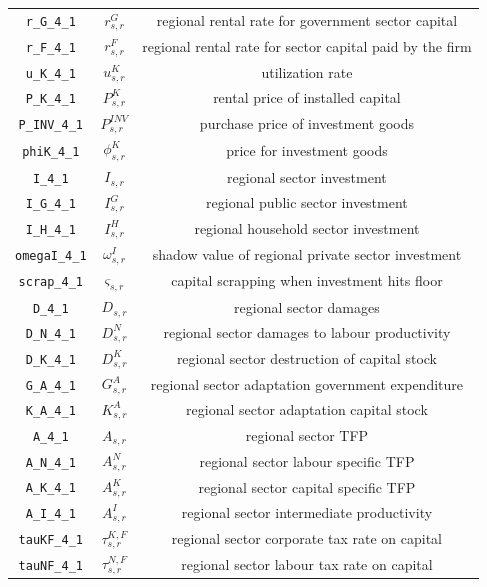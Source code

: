 \begin{center}
\begin{longtable}{ccc}
\texttt{r\_G\_4\_1} & ${r^G_{s,r}}$ & regional rental rate for government sector capital\\
\texttt{r\_F\_4\_1} & ${r^F_{s,r}}$ & regional rental rate for sector capital paid by the firm\\
\texttt{u\_K\_4\_1} & ${u^K_{s,r}}$ & utilization rate\\
\texttt{P\_K\_4\_1} & ${P^K_{s,r}}$ & rental price of installed capital\\
\texttt{P\_INV\_4\_1} & ${P^{INV}_{s,r}}$ & purchase price of investment goods\\
\texttt{phiK\_4\_1} & ${\phi^K_{s,r}}$ & price for investment goods\\
\texttt{I\_4\_1} & ${I_{s,r}}$ & regional sector investment\\
\texttt{I\_G\_4\_1} & ${I^G_{s,r}}$ & regional public sector investment\\
\texttt{I\_H\_4\_1} & ${I^H_{s,r}}$ & regional household sector investment\\
\texttt{omegaI\_4\_1} & ${\omega^I_{s,r}}$ & shadow value of regional private sector investment\\
\texttt{scrap\_4\_1} & ${\varsigma_{s,r}}$ & capital scrapping when investment hits floor\\
\texttt{D\_4\_1} & ${D_{s,r}}$ & regional sector damages\\
\texttt{D\_N\_4\_1} & ${D^N_{s,r}}$ & regional sector damages to labour productivity\\
\texttt{D\_K\_4\_1} & ${D^K_{s,r}}$ & regional sector destruction of capital stock\\
\texttt{G\_A\_4\_1} & ${G^{A}_{s,r}}$ & regional sector adaptation government expenditure\\
\texttt{K\_A\_4\_1} & ${K^{A}_{s,r}}$ & regional sector adaptation capital stock\\
\texttt{A\_4\_1} & ${A_{s,r}}$ & regional sector TFP\\
\texttt{A\_N\_4\_1} & ${A^{N}_{s,r}}$ & regional sector labour specific TFP\\
\texttt{A\_K\_4\_1} & ${A^{K}_{s,r}}$ & regional sector capital specific TFP\\
\texttt{A\_I\_4\_1} & ${A^{I}_{s,r}}$ & regional sector intermediate productivity\\
\texttt{tauKF\_4\_1} & ${\tau^{K,F}_{s,r}}$ & regional sector corporate tax rate on capital\\
\texttt{tauNF\_4\_1} & ${\tau^{N,F}_{s,r}}$ & regional sector labour tax rate on capital\\

\end{longtable}
\end{center}

